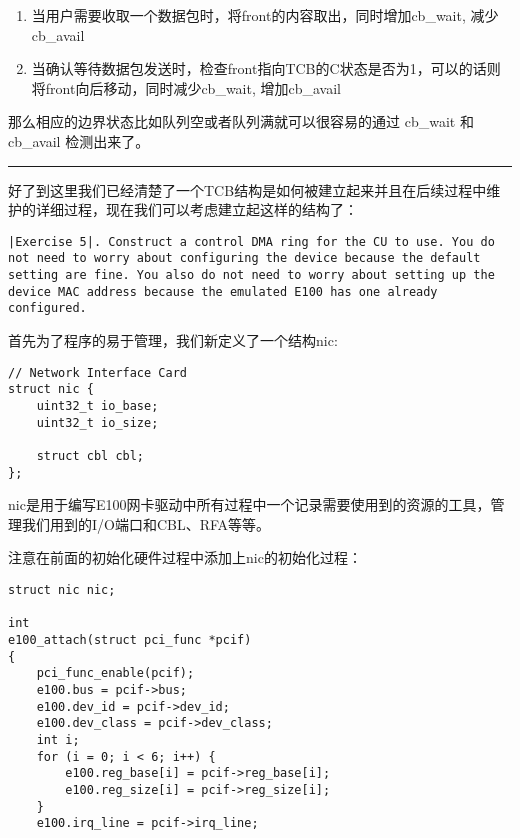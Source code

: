 \documentclass{article}
\begin{document}
\begin{CJK*}{UTF8}{gkai}
\begin{enumerate}
{并且rfd\_avail = RFD\_MAX\_NUM, rfd\_wait = 0}
\item{当用户需要收取一个数据包时，将front的内容取出，同时增加cb\_wait, 减少cb\_avail}
\item{当确认等待数据包发送时，检查front指向TCB的C状态是否为1，可以的话则将front向后移动，同时减少cb\_wait, 增加cb\_avail}

\end{enumerate}

那么相应的边界状态比如队列空或者队列满就可以很容易的通过 cb\_wait 和 cb\_avail 检测出来了。

\vspace{2em}
\hrule
\vspace{2em}

好了到这里我们已经清楚了一个TCB结构是如何被建立起来并且在后续过程中维护的详细过程，现在我们可以考虑建立起这样的结构了：

\begin{lstlisting}[style=exercise]
|Exercise 5|. Construct a control DMA ring for the CU to use. You do not need to worry about configuring the device because the default setting are fine. You also do not need to worry about setting up the device MAC address because the emulated E100 has one already configured.
\end{lstlisting}

首先为了程序的易于管理，我们新定义了一个结构nic:

\begin{lstlisting}[style=ccode, title={\scriptsize \ttfamily \bfseries kern/e100.h}]
// Network Interface Card
struct nic {
    uint32_t io_base;
    uint32_t io_size;

    struct cbl cbl;
};\end{lstlisting}

nic是用于编写E100网卡驱动中所有过程中一个记录需要使用到的资源的工具，管理我们用到的I/O端口和CBL、RFA等等。

注意在前面的初始化硬件过程中添加上nic的初始化过程：

\begin{lstlisting}[style=ccode, title={\scriptsize \ttfamily \bfseries kern/e100.c}]
struct nic nic;

int
e100_attach(struct pci_func *pcif) 
{
    pci_func_enable(pcif);
    e100.bus = pcif->bus;
    e100.dev_id = pcif->dev_id;
    e100.dev_class = pcif->dev_class;
    int i;
    for (i = 0; i < 6; i++) {
    	e100.reg_base[i] = pcif->reg_base[i];
        e100.reg_size[i] = pcif->reg_size[i];
    }
    e100.irq_line = pcif->irq_line;


\end{lstlisting}
\end{CJK*}
\end{document}
